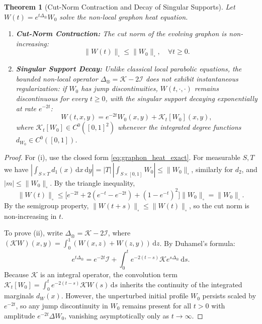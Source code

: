 \documentclass[11pt,a4paper,reqno]{amsart}
\newtheorem{theorem}{Theorem}[section]
\theoremstyle{definition}
\numberwithin{equation}{section}
\providecommand{\cutnorm}[1]{\|#1\|_{\square}}
\newcommand{\dif}{\,\mathrm{d}}
\providecommand{\cutnorm}[1]{\|#1\|_{\square}}
\begin{document}
\begin{theorem}[Cut-Norm Contraction and Decay of Singular Supports]
\label{thm:heat_smoothing}
Let $W(t) = e^{t \Delta_\otimes} W_0$ solve the non-local graphon heat equation.
\begin{enumerate}[label=(\roman*)]
    \item \textbf{Cut-Norm Contraction:} The cut norm of the evolving graphon is non-increasing:
    \begin{equation}
        \cutnorm{W(t)} \le \cutnorm{W_0}, \quad \forall t \ge 0.
    \end{equation}
    \item \textbf{Singular Support Decay:} Unlike classical local parabolic equations, the bounded non-local operator $\Delta_\otimes = \mathcal{K} - 2\mathcal{I}$ does not exhibit instantaneous regularization: if $W_0$ has jump discontinuities, $W(t, \cdot, \cdot)$ remains discontinuous for every $t \ge 0$, with the singular support decaying exponentially at rate $e^{-2t}$:
    \begin{equation}
        W(t, x, y) = e^{-2t} W_0(x, y) + \mathcal{K}_t[W_0](x, y),
    \end{equation}
    where $\mathcal{K}_t[W_0] \in C^0([0, 1]^2)$ whenever the integrated degree functions $d_{W_0} \in C^0([0, 1])$.
\end{enumerate}
\end{theorem}
\begin{proof}
For (i), use the closed form \eqref{eq:graphon_heat_exact}. For measurable $S, T$ we have $|\int_{S \times T} d_1(x)\dif x\dif y| = |T|\,|\int_{S\times[0,1]} W_0| \le \cutnorm{W_0}$, similarly for $d_2$, and $|m| \le \cutnorm{W_0}$. By the triangle inequality,
\[
\cutnorm{W(t)} \le \big[e^{-2t} + 2(e^{-t} - e^{-2t}) + (1 - e^{-t})^2\big]\cutnorm{W_0} = \cutnorm{W_0}.
\]
By the semigroup property, $\cutnorm{W(t+s)} \le \cutnorm{W(t)}$, so the cut norm is non-increasing in $t$.

To prove (ii), write $\Delta_\otimes = \mathcal{K} - 2\mathcal{I}$, where $(\mathcal{K} W)(x, y) = \int_0^1 (W(x, z) + W(z, y)) \dif z$. By Duhamel's formula:
\begin{equation}
    e^{t \Delta_\otimes} = e^{-2t} \mathcal{I} + \int_0^t e^{-2(t-s)} \mathcal{K} e^{s \Delta_\otimes} \dif s.
\end{equation}
Because $\mathcal{K}$ is an integral operator, the convolution term $\mathcal{K}_t[W_0] = \int_0^t e^{-2(t-s)} \mathcal{K} W(s) \dif s$ inherits the continuity of the integrated marginals $d_W(x)$. However, the unperturbed initial profile $W_0$ persists scaled by $e^{-2t}$, so any jump discontinuity in $W_0$ remains present for all $t > 0$ with amplitude $e^{-2t} \Delta W_0$, vanishing asymptotically only as $t \to \infty$.
\end{proof}
\end{document}
